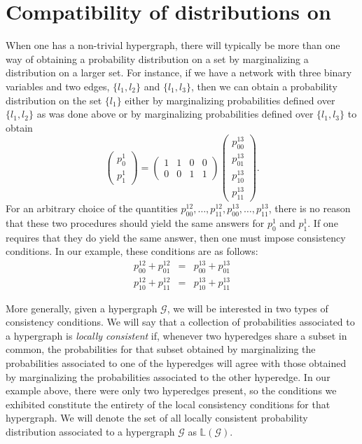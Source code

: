 \section{Compatibility of distributions on \gnpm{}}\label{sec:compatibilityofgpms}
When one has a non-trivial hypergraph, there will typically be more
than one way of obtaining a probability distribution on a set by
marginalizing a distribution on a larger set.  For instance, if we have
a network with three binary variables and two edges, $\{l_1,l_2\}$ and
$\{l_1,l_3\}$, then we can obtain a probability distribution on the
set $\{l_1\}$ either by marginalizing probabilities defined over
$\{l_1,l_2\}$ as was done above or by marginalizing probabilities
defined over $\{l_1,l_3\}$ to obtain
\begin{equation}
 \begin{pmatrix}
  p^{1}_{0}\\
  p^{1}_{1}
 \end{pmatrix} =
 \begin{pmatrix}
  1 & 1 & 0 & 0\\
  0 & 0 & 1 & 1
 \end{pmatrix}
 \begin{pmatrix}
  p^{13}_{00}\\
  p^{13}_{01}\\
  p^{13}_{10}\\
  p^{13}_{11}
 \end{pmatrix}.
\end{equation}
For an arbitrary choice of the quantities $p^{12}_{00}, \ldots,
p^{12}_{11}, p^{13}_{00}, \ldots, p^{13}_{11}$, there is no reason
that these two procedures should yield the same answers for $p^1_0$
and $p^1_1$.  If one requires that they do yield the same answer, then
one must impose consistency conditions.   In our example, these
conditions are as follows:
\begin{eqnarray}
 p^{12}_{00} + p^{12}_{01} &=&
  p^{13}_{00} + p^{13}_{01}\\
 p^{12}_{10} + p^{12}_{11} &=&
  p^{13}_{10} + p^{13}_{11}
\end{eqnarray}

More generally, given a hypergraph $\mathcal{G}$, we will be
interested in two types of consistency conditions.  We will say that a
collection of probabilities associated to a hypergraph is
\emph{locally consistent} if, whenever two hyperedges share a subset in
common, the probabilities for that subset obtained by marginalizing
the probabilities associated to one of the hyperedges will agree with
those obtained by marginalizing the probabilities associated to the
other hyperedge.  In our example above, there were only two hyperedges
present, so the conditions we exhibited constitute the entirety of the
local consistency conditions for that hypergraph.  We will denote the
set of all locally consistent probability distribution associated to a
hypergraph $\mathcal{G}$ as $\mathbb{L}(\mathcal{G})$.

